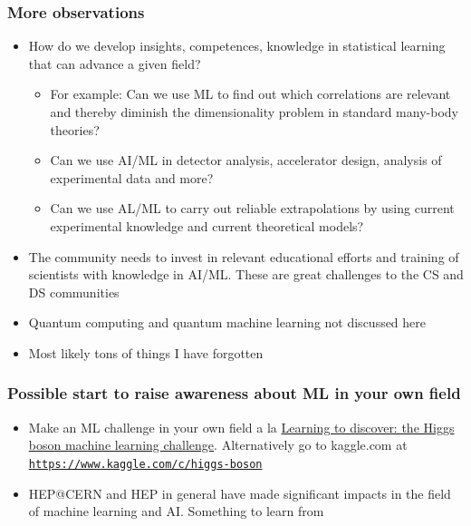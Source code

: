 \documentclass{beamer}
\begin{document}
\begin{frame}
\frametitle{More observations}

\begin{block}{}
\begin{itemize}
\item How do we develop insights, competences, knowledge in statistical learning that can advance a given field?
\begin{itemize}

  \item For example: Can we use ML to find out which correlations are relevant and thereby diminish the dimensionality problem in standard many-body  theories?

  \item Can we use AI/ML in detector analysis, accelerator design, analysis of experimental data and more?

  \item Can we use AL/ML to carry out reliable extrapolations by using current experimental knowledge and current theoretical models?

\end{itemize}

\noindent
\item The community needs to invest in relevant educational efforts and training of scientists with knowledge in AI/ML. These are great challenges to the CS and DS communities

\item Quantum computing and quantum machine learning not discussed here

\item Most likely tons of things I have forgotten
\end{itemize}

\noindent
\end{block}
\end{frame}

\begin{frame}
\frametitle{Possible start to raise awareness about ML in your own field}

\begin{block}{}
\begin{itemize}
\item Make an ML challenge in your own field a la \href{{https://home.cern/news/news/computing/higgs-boson-machine-learning-challenge}}{Learning to discover: the Higgs boson machine learning challenge}. Alternatively go to kaggle.com at \href{{https://www.kaggle.com/c/higgs-boson}}{\nolinkurl{https://www.kaggle.com/c/higgs-boson}}

\item HEP@CERN and HEP in general have made significant impacts in the field of machine learning and AI. Something to learn from
\end{itemize}

\noindent
\end{block}
\end{frame}
\end{document}
